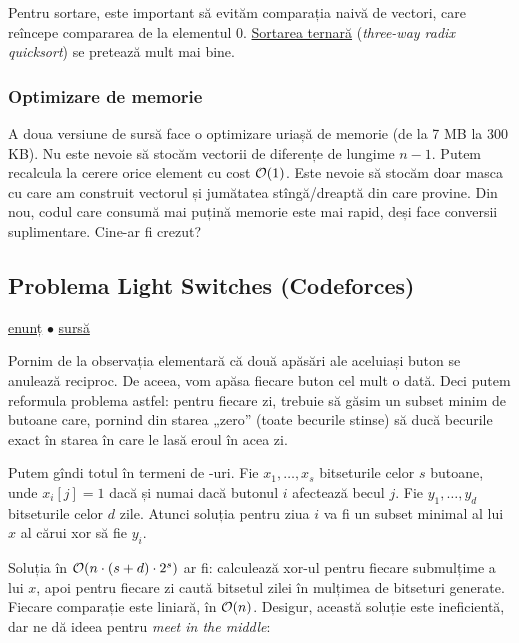 \documentclass[../main.tex]{subfiles}
\begin{document}
Pentru sortare, este important să evităm comparația naivă de vectori, care reîncepe compararea de la elementul 0. \hyperref[chapter:ternary-sort]{Sortarea ternară} (\textit{three-way radix quicksort}) se pretează mult mai bine.

\subsubsection*{Optimizare de memorie}

A doua versiune de sursă face o optimizare uriașă de memorie (de la 7 MB la 300 KB). Nu este nevoie să stocăm vectorii de diferențe de lungime $n-1$. Putem recalcula la cerere orice element cu cost $\mathcal{O}(1)$. Este nevoie să stocăm doar masca cu care am construit vectorul și jumătatea stîngă/dreaptă din care provine. Din nou, codul care consumă mai puțină memorie este mai rapid, deși face conversii suplimentare. Cine-ar fi crezut? 


\subsection{Problema Light Switches (Codeforces)}
\label{problem:light-switches}

\href{https://codeforces.com/contest/1423/problem/L}{enunț}
$\bullet$
\hyperref[code:light-switches]{sursă}

Pornim de la observația elementară că două apăsări ale aceluiași buton se anulează reciproc. De aceea, vom apăsa fiecare buton cel mult o dată. Deci putem reformula problema astfel: pentru fiecare zi, trebuie să găsim un subset minim de butoane care, pornind din starea „zero” (toate becurile stinse) să ducă becurile exact în starea în care le lasă eroul în acea zi.

Putem gîndi totul în termeni de -uri. Fie $x_1, \dots, x_s$ bitseturile celor $s$ butoane, unde $x_i[j]=1$ dacă și numai dacă butonul $i$ afectează becul $j$. Fie $y_1, \dots, y_d$ bitseturile celor $d$ zile. Atunci soluția pentru ziua $i$ va fi un subset minimal al lui $x$ al cărui xor să fie $y_i$.

Soluția în $\mathcal{O}(n \cdot (s + d) \cdot 2^s)$ ar fi: calculează xor-ul pentru fiecare submulțime a lui $x$, apoi pentru fiecare zi caută bitsetul zilei în mulțimea de bitseturi generate. Fiecare comparație este liniară, în $\mathcal{O}(n)$. Desigur, această soluție este ineficientă, dar ne dă ideea pentru \textit{meet in the middle}:
\end{document}
